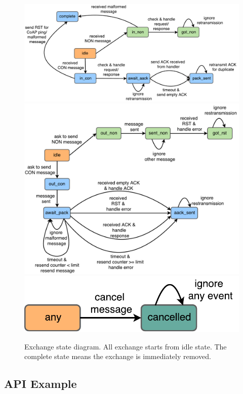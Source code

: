 \begin{figure}[!htbp]
\centering
\includegraphics[scale = 0.55]{exchange_state_in}
\includegraphics[scale = 0.55]{exchange_state_out}
\includegraphics[scale = 0.55]{exchange_state_cancel}
\caption{Exchange state diagram. All exchange starts from idle state. The complete state means the exchange is immediately removed.}
\label{fig:exchange_state_transition}
\end{figure}

\subsection{API Example}\label{api_example}

